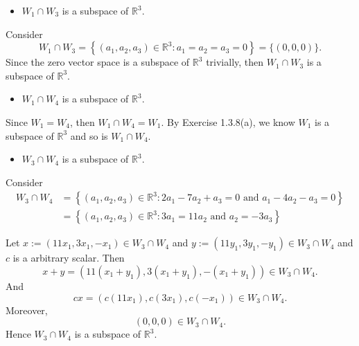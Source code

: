 \begin{Exercise}
	\begin{itemize}
		\item $W_1\cap W_3$ is a subspace of $\mathbb{R}^3$.
	\end{itemize}
	\begin{solution}
		Consider
		$$
		W_1\cap W_3 = \left\{(a_1, a_2, a_3)\in\mathbb{R}^3: a_1 = a_2 = a_3 = 0\right\}
		= \{(0,0,0)\}.
		$$
		Since the zero vector space is a subspace of $\mathbb{R}^3$ trivially, then $W_1\cap W_3$ is a subspace of $\mathbb{R}^3$.
	\end{solution}
	
	\begin{itemize}
		\item $W_1\cap W_4$ is a subspace of $\mathbb{R}^3$.
	\end{itemize}
	\begin{solution}
		Since $W_1 = W_4$, then $W_1\cap W_4 = W_1$. By Exercise 1.3.8(a), we know $W_1$ is a subspace of $\mathbb{R}^3$ and so is $W_1\cap W_4$.
	\end{solution}
	
	\begin{itemize}
		\item $W_3\cap W_4$ is a subspace of $\mathbb{R}^3$.
	\end{itemize}
	\begin{solution}
		Consider
		\begin{align*}
			W_3\cap W_4 
			&= \left\{(a_1, a_2, a_3)\in\mathbb{R}^3: 2a_1-7a_2+a_3 = 0\text{ and } a_1-4a_2-a_3 = 0\right\} \\
			&= \left\{(a_1, a_2, a_3)\in\mathbb{R}^3: 3a_1 = 11a_2\text{ and } a_2=-3a_3\right\}
		\end{align*}
		
		Let $x := (11x_1,3x_1,-x_1)\in W_3\cap W_4 $ and $y := (11y_1,3y_1,-y_1)\in W_3\cap W_4 $ and $c$ is a arbitrary scalar. Then
		$$
		x+y
		= (11(x_1+y_1), 3(x_1+y_1), -(x_1+y_1)) \in W_3\cap W_4.
		$$
		And
		$$
		c x
		= (c (11x_1), c (3x_1), c(-x_1)) \in W_3\cap W_4.
		$$
		Moreover,
		$$
		(0,0,0) \in W_3\cap W_4.
		$$
		Hence $W_3\cap W_4$ is a subspace of $\mathbb{R}^3$.
	\end{solution}
	
\end{Exercise}